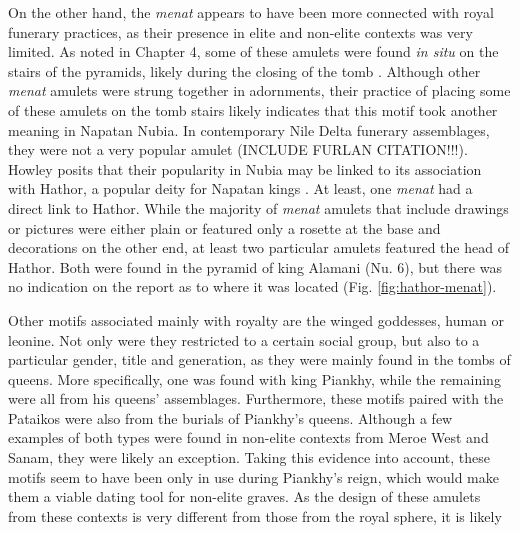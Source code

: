 On the other hand, the \textit{menat} appears to have been more connected with royal funerary practices, as their presence in elite and non-elite contexts was very limited. As noted in Chapter 4, some of these amulets were found \textit{in situ} on the stairs of the pyramids, likely during the closing of the tomb \parencites[p.~246]{howleyRoyalPyramidTombs2015}. Although other \textit{menat} amulets were strung together in adornments, their practice of placing some of these amulets on the tomb stairs likely indicates that this motif took another meaning in Napatan Nubia. In contemporary Nile Delta funerary assemblages, they were not a very popular amulet (INCLUDE FURLAN CITATION!!!). Howley posits that their popularity in Nubia may be linked to its association with Hathor, a popular deity for Napatan kings \parencites[p.~246]{howleyRoyalPyramidTombs2015}. At least, one \textit{menat} had a direct link to Hathor. While the majority of \textit{menat} amulets that include drawings or pictures were either plain or featured only a rosette at the base and decorations on the other end, at least two particular amulets featured the head of Hathor. Both were found in the pyramid of king Alamani (Nu. 6), but there was no indication on the report as to where it was located \parencite[p.~58]{dunhamNuri1955} (Fig. \ref{fig:hathor-menat}).


Other motifs associated mainly with royalty are the winged goddesses, human or leonine. Not only were they restricted to a certain social group, but also to a particular gender, title and generation, as they were mainly found in the tombs of queens. More specifically, one was found with king Piankhy, while the remaining were all from his queens' assemblages. Furthermore, these motifs paired with the Pataikos were also from the burials of Piankhy's queens. Although a few examples of both types were found in non-elite contexts from Meroe West and Sanam, they were likely an exception. Taking this evidence into account, these motifs seem to have been only in use during Piankhy's reign, which would make them a viable dating tool for non-elite graves. As the design of these amulets from these contexts is very different from those from the royal sphere, it is likely 


